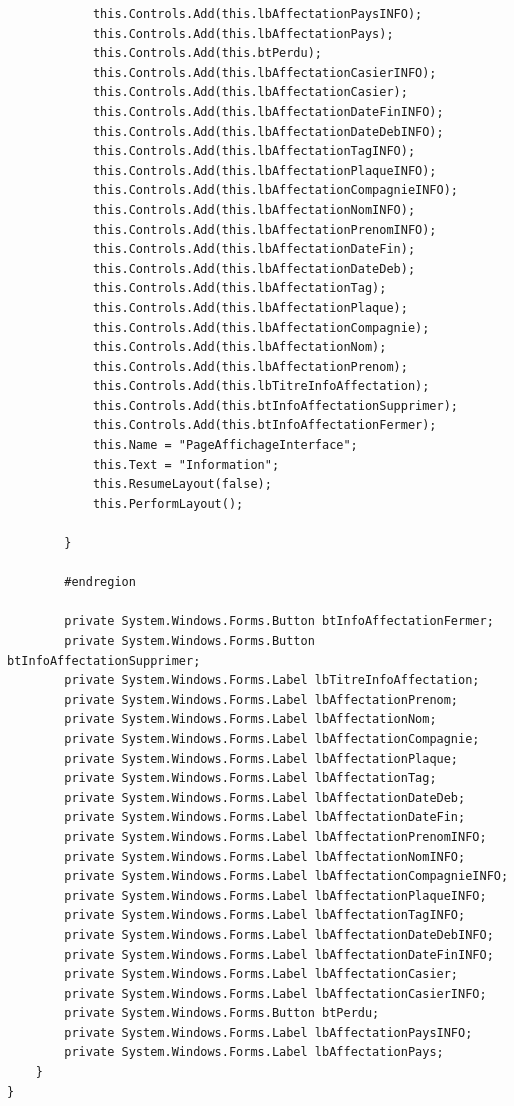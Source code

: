 \documentclass[main.tex]{subfiles}
\begin{document}
\begin{lstlisting}
            this.Controls.Add(this.lbAffectationPaysINFO);
            this.Controls.Add(this.lbAffectationPays);
            this.Controls.Add(this.btPerdu);
            this.Controls.Add(this.lbAffectationCasierINFO);
            this.Controls.Add(this.lbAffectationCasier);
            this.Controls.Add(this.lbAffectationDateFinINFO);
            this.Controls.Add(this.lbAffectationDateDebINFO);
            this.Controls.Add(this.lbAffectationTagINFO);
            this.Controls.Add(this.lbAffectationPlaqueINFO);
            this.Controls.Add(this.lbAffectationCompagnieINFO);
            this.Controls.Add(this.lbAffectationNomINFO);
            this.Controls.Add(this.lbAffectationPrenomINFO);
            this.Controls.Add(this.lbAffectationDateFin);
            this.Controls.Add(this.lbAffectationDateDeb);
            this.Controls.Add(this.lbAffectationTag);
            this.Controls.Add(this.lbAffectationPlaque);
            this.Controls.Add(this.lbAffectationCompagnie);
            this.Controls.Add(this.lbAffectationNom);
            this.Controls.Add(this.lbAffectationPrenom);
            this.Controls.Add(this.lbTitreInfoAffectation);
            this.Controls.Add(this.btInfoAffectationSupprimer);
            this.Controls.Add(this.btInfoAffectationFermer);
            this.Name = "PageAffichageInterface";
            this.Text = "Information";
            this.ResumeLayout(false);
            this.PerformLayout();

        }

        #endregion

        private System.Windows.Forms.Button btInfoAffectationFermer;
        private System.Windows.Forms.Button btInfoAffectationSupprimer;
        private System.Windows.Forms.Label lbTitreInfoAffectation;
        private System.Windows.Forms.Label lbAffectationPrenom;
        private System.Windows.Forms.Label lbAffectationNom;
        private System.Windows.Forms.Label lbAffectationCompagnie;
        private System.Windows.Forms.Label lbAffectationPlaque;
        private System.Windows.Forms.Label lbAffectationTag;
        private System.Windows.Forms.Label lbAffectationDateDeb;
        private System.Windows.Forms.Label lbAffectationDateFin;
        private System.Windows.Forms.Label lbAffectationPrenomINFO;
        private System.Windows.Forms.Label lbAffectationNomINFO;
        private System.Windows.Forms.Label lbAffectationCompagnieINFO;
        private System.Windows.Forms.Label lbAffectationPlaqueINFO;
        private System.Windows.Forms.Label lbAffectationTagINFO;
        private System.Windows.Forms.Label lbAffectationDateDebINFO;
        private System.Windows.Forms.Label lbAffectationDateFinINFO;
        private System.Windows.Forms.Label lbAffectationCasier;
        private System.Windows.Forms.Label lbAffectationCasierINFO;
        private System.Windows.Forms.Button btPerdu;
        private System.Windows.Forms.Label lbAffectationPaysINFO;
        private System.Windows.Forms.Label lbAffectationPays;
    }
}
\end{lstlisting}
\end{document}
